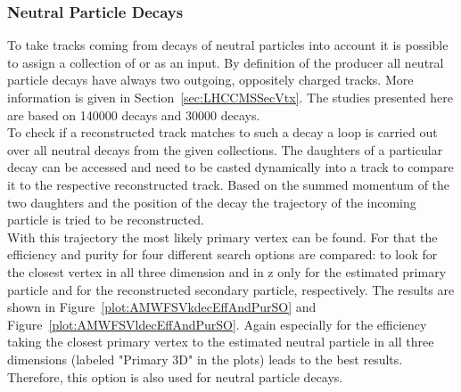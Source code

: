 \subsubsection{Neutral Particle Decays \label{sec:AMWFSVnd}}
To take tracks coming from decays of neutral particles into account it is possible to assign a collection of \PKzS{} or \PgL{} as an input. By definition of the producer all neutral particle decays have always two outgoing, oppositely charged tracks. More information is given in Section~\ref{sec:LHCCMSSecVtx}. The studies presented here are based on 140000 \PKzS{} decays and 30000 \PgL{} decays.  \\
To check if a reconstructed track matches to such a decay a loop is carried out over all neutral decays from the given collections. The daughters of a particular decay can be accessed and need to be casted dynamically into a track to compare it to the respective reconstructed track. Based on the summed momentum of the two daughters and the position of the decay the trajectory of the incoming particle is tried to be reconstructed. \\
With this trajectory the most likely primary vertex can be found.  For that the efficiency and purity for four different search options are compared: to look for the closest vertex in all three dimension and in z only for the estimated primary particle and for the reconstructed secondary particle, respectively. The results are shown in Figure~\ref{plot:AMWFSVkdecEffAndPurSO} and Figure~\ref{plot:AMWFSVldecEffAndPurSO}. Again especially for the efficiency taking the closest primary vertex to the estimated neutral particle in all three dimensions (labeled "Primary 3D" in the plots) leads to the best results. Therefore, this option is also used for neutral particle decays.

